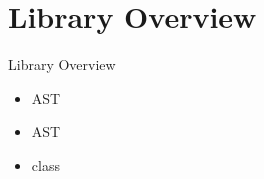 \section{Library Overview}

\begin{frame}{Library Overview}
  \begin{itemize}
  \item {} AST
  \item {} AST
  \item {}  class
  \end{itemize}
\end{frame}





